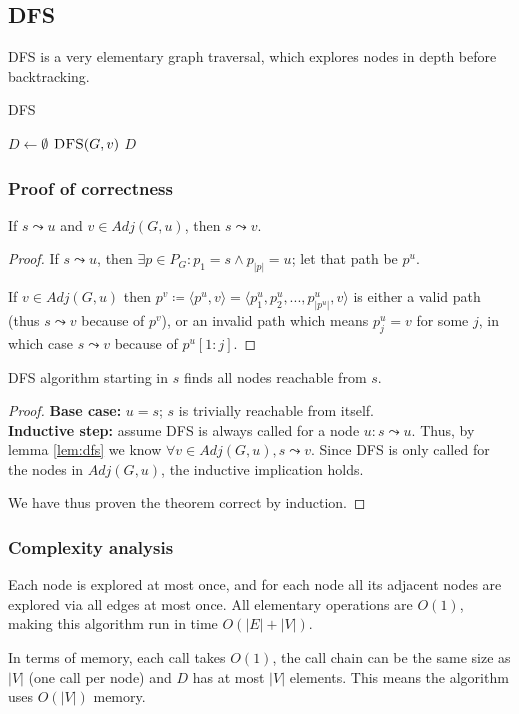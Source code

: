\subsection{\texorpdfstring{\Acrlong*{DFS}}{Depth-first search}} \label{algorithm-reachability-dfs}
\Acrlong*{DFS} is a very elementary graph traversal, which explores nodes in depth before backtracking.
\begin{algorithm}[h]
    \caption{\Acrlong*{DFS}}
    \label{alg-dfs}
    \begin{algorithmic}[1]
        \State $D \gets \emptyset$
             \Return {$ $}
            \EndIf 
             {$\Call{DFS}{G, v}$}
            \EndFor
            \State \Return $D$
        \EndFunction
    \end{algorithmic}
\end{algorithm}
\subsubsection{Proof of correctness}
\begin{lemma} \label{lem:dfs}
    If $s \leadsto u$ and $v \in Adj(G, u)$, then $s \leadsto v$.
\end{lemma}
\begin{proof}
    If $s \leadsto u$, then $\exists p \in P_G \colon p_1 = s \wedge p_{|p|} = u$; let that path be $p^u$.\par
    If $v \in Adj(G, u)$ then $p^v \coloneqq \langle p^u, v \rangle = \langle p^u_1, p^u_2,...,p^u_{|p^u|}, v\rangle$ is either a valid path (thus $s \leadsto v$ because of $p^v$), or an invalid path which means $p^u_j = v$ for some $j$, in which case $s \leadsto v$ because of $p^u[1:j]$.
\end{proof}
\begin{theorem}
    \Acrlong*{DFS} algorithm starting in $s$ finds all nodes reachable from $s$.
\end{theorem}
\begin{proof} \textbf{Base case:} $u=s$; $s$ is trivially reachable from itself. \\
\textbf{Inductive step:} assume \textsc{DFS} is always called for a node $u \colon s \leadsto u$. Thus, by lemma \ref{lem:dfs} we know $\forall v \in Adj(G,u), s \leadsto v$. Since \textsc{DFS} is only called for the nodes in $Adj(G,u)$, the inductive implication holds.\par
We have thus proven the theorem correct by induction.
\end{proof}
\subsubsection{Complexity analysis}
Each node is explored at most once, and for each node all its adjacent nodes are explored via all edges at most once. All elementary operations are $O(1)$, making this algorithm run in time $O(|E|+|V|)$.\par
In terms of memory, each call takes $O(1)$, the call chain can be the same size as $|V|$ (one call per node) and $D$ has at most $|V|$ elements. This means the algorithm uses $O(|V|)$ memory.
